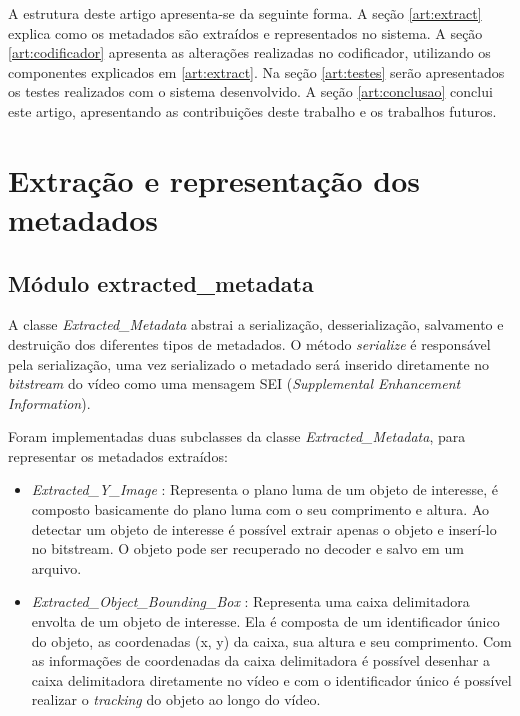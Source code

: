 \documentclass[12pt]{article}
\begin{document}
A estrutura deste artigo apresenta-se da seguinte forma. A seção \ref{art:extract} explica como os metadados são extraídos e representados no sistema. A seção \ref{art:codificador} apresenta as alterações realizadas no codificador, utilizando os componentes explicados em \ref{art:extract}. Na seção \ref{art:testes} serão apresentados os testes realizados com o sistema desenvolvido. A seção \ref{art:conclusao} conclui este artigo, apresentando as contribuições deste trabalho e os trabalhos futuros.


\section*{Extração e representação dos metadados}
\label{art:extract}

\subsection{ Módulo extracted\_metadata }

A classe \textit{Extracted\_Metadata} abstrai a serialização, desserialização, salvamento e destruição dos diferentes tipos de metadados. O método \textit{serialize} é responsável pela serialização, uma vez serializado o metadado será inserido diretamente no \textit{bitstream} do vídeo como uma mensagem SEI (\textit{Supplemental Enhancement Information}). 

Foram implementadas duas subclasses da classe \textit{Extracted\_Metadata}, para representar os metadados extraídos:

\begin{itemize}

        \item \textit{ Extracted\_Y\_Image }: Representa o plano luma de um objeto de interesse, é composto basicamente do plano luma com o seu comprimento e altura. Ao detectar um objeto de interesse é possível extrair apenas o objeto e inserí-lo no bitstream. O objeto pode ser recuperado no decoder e salvo em um arquivo.
        \item \textit{ Extracted\_Object\_Bounding\_Box }: Representa uma caixa delimitadora envolta de um objeto de interesse. Ela é composta de um identificador único do objeto, as coordenadas (x, y) da caixa, sua altura e seu comprimento. Com as informações de coordenadas da caixa delimitadora é possível desenhar a caixa delimitadora diretamente no vídeo e com o identificador único é possível realizar o \textit{tracking} do objeto ao longo do vídeo.

\end{itemize}
\end{document}
